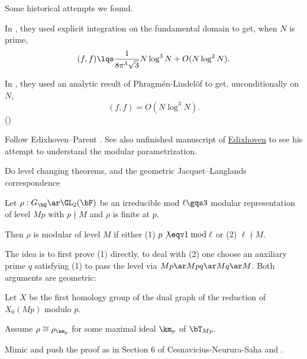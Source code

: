 \documentclass[a4paper, twoside]{article}
\begin{document}
\begin{rmk}
	Some historical attempts we found.
	\begin{itm}
		\item In \cite[(12)]{Zagier1985Parametrization}, they used explicit integration on the fundamental domain to get, when $N$ is prime,
		\[
			(f,f)\lqs\frac{1}{8\pi^{3}\sqrt{3}}N\log^{3}{N}+O(N\log^{2}{N}).
		\]
		\item In \cite{MM1994Modular}, they used an analytic result of Phragm{\'e}n-Lindel{\" o}f to get, unconditionally on $N$,
		\[
			(f,f)=O(N\log^{3}{N}).
		\]
		()
	\end{itm}
\end{rmk}

Follow Edixhoven--Parent \cite{EP2021}. See also unfinished manuscript of \href{https://websites.math.leidenuniv.nl/edixhoven/publications/2001/modular_parametrisations.pdf}{Edixhoven} to see his attempt to understand the modular parametrization.



Do level changing theorems, and the geometric Jacquet--Langlands correspondence
\begin{thm}
	Let $\rho:G_{\bQ}\ar\GL_{2}(\bF)$ be an irreducible mod $\ell\gqs3$ modular representation of level $Mp$ with $p\nmid M$ and $\rho$ is finite at $p$.

	Then $\rho$ is modular of level $M$ if either (1) $p\not\eqv1\bmod{\ell}$ or (2) $\ell\nmid M$.
\end{thm}
\begin{prf}
	The idea is to first prove (1) directly, to deal with (2) one choose an auxiliary prime $q$ satisfying (1) to pass the level via $Mp\ar Mpq\ar Mq\ar M$. Both arguments are geometric:

	 Let $X$ be the first homology group of the dual graph of the reduction of $X_{0}(Mp)$ modulo $p$.



	Assume $\rho\cong\rho_{\km_{p}}$ for some maximal ideal $\km_{p}$ of $\bT_{Mp}$.
\end{prf}





Mimic and push the proof as in Section 6 of Cesnavicius-Neurura-Saha and \cite{Raynaud1991}.



\printref
\end{document}

